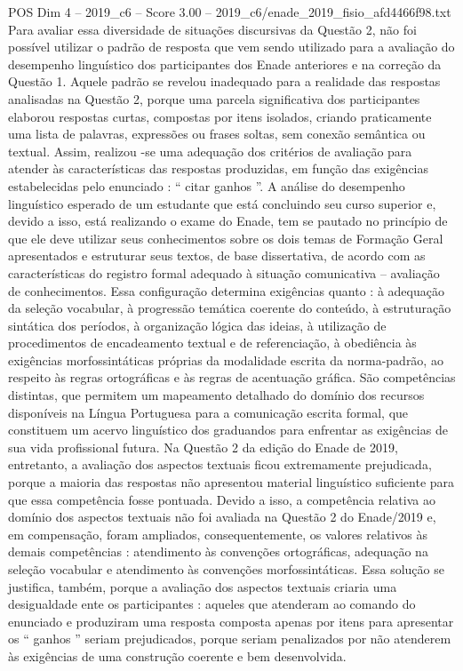 \begin{textsample}{POS Dim 4 – 2019\_c6 – Score 3.00 – 2019\_c6/enade\_2019\_fisio\_afd4466f98.txt}
Para avaliar essa diversidade de situações discursivas da Questão 2, não foi possível utilizar o padrão de resposta que vem sendo utilizado para a avaliação do desempenho linguístico dos participantes dos Enade anteriores e na correção da Questão 1.
Aquele padrão se revelou inadequado para a realidade das respostas analisadas na Questão 2, porque uma parcela significativa dos participantes elaborou respostas curtas, compostas por itens isolados, criando praticamente uma lista de palavras, expressões ou frases soltas, sem conexão semântica ou textual.
Assim, realizou -se uma adequação dos critérios de avaliação para atender às características das respostas produzidas, em função das exigências estabelecidas pelo enunciado : “ citar ganhos ”.
A análise do desempenho linguístico esperado de um estudante que está concluindo seu curso superior e, devido a isso, está realizando o exame do Enade, tem se pautado no princípio de que ele deve utilizar seus conhecimentos sobre os dois temas de Formação Geral apresentados e estruturar seus textos, de base dissertativa, de acordo com as características do registro formal adequado à situação comunicativa – avaliação de conhecimentos.
Essa configuração determina exigências quanto : à adequação da seleção vocabular, à progressão temática coerente do conteúdo, à estruturação sintática dos períodos, à organização lógica das ideias, à utilização de procedimentos de encadeamento textual e de referenciação, à obediência às exigências morfossintáticas próprias da modalidade escrita da norma-padrão, ao respeito às regras ortográficas e às regras de acentuação gráfica.
São competências distintas, que permitem um mapeamento detalhado do domínio dos recursos disponíveis na Língua Portuguesa para a comunicação escrita formal, que constituem um acervo linguístico dos graduandos para enfrentar as exigências de sua vida profissional futura.
Na Questão 2 da edição do Enade de 2019, entretanto, a avaliação dos aspectos textuais ficou extremamente prejudicada, porque a maioria das respostas não apresentou material linguístico suficiente para que essa competência fosse pontuada.
Devido a isso, a competência relativa ao domínio dos aspectos textuais não foi avaliada na Questão 2 do Enade/2019 e, em compensação, foram ampliados, consequentemente, os valores relativos às demais competências : atendimento às convenções ortográficas, adequação na seleção vocabular e atendimento às convenções morfossintáticas.
Essa solução se justifica, também, porque a avaliação dos aspectos textuais criaria uma desigualdade ente os participantes : aqueles que atenderam ao comando do enunciado e produziram uma resposta composta apenas por itens para apresentar os “ ganhos ” seriam prejudicados, porque seriam penalizados por não atenderem às exigências de uma construção coerente e bem desenvolvida.

\end{textsample}
